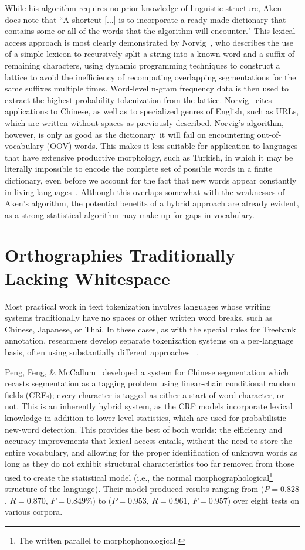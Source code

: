 While his algorithm requires no prior knowledge of linguistic structure, Aken~\cite{aken11} does note that ``A shortcut [...] is to incorporate a ready-made dictionary that contains some or all of the words that the algorithm will encounter." This lexical-access approach is most clearly demonstrated by Norvig~\cite{norvig14}, who describes the use of a simple lexicon to recursively split a string into a known word and a suffix of remaining characters, using dynamic programming techniques to construct a lattice to avoid the inefficiency of recomputing overlapping segmentations for the same suffixes multiple times. Word-level n-gram frequency data is then used to extract the highest probability tokenization from the lattice. Norvig~\cite{norvig14} cites applications to Chinese, as well as to specialized genres of English, such as URLs, which are written without spaces as previously described.
Norvig's algorithm, however, is only as good as the dictionary\textemdash~it will fail on encountering out-of-vocabulary (OOV) words. This makes it less suitable for application to languages that have extensive productive morphology, such as Turkish, in which it may be literally impossible to encode the complete set of possible words in a finite dictionary, even before we account for the fact that new words appear constantly in living languages~\cite{islam07}. Although this overlaps somewhat with the weaknesses of Aken's algorithm, the potential benefits of a hybrid approach are already evident, as a strong statistical algorithm may make up for gaps in vocabulary.

\section{Orthographies Traditionally Lacking Whitespace}
Most practical work in text tokenization involves languages whose writing systems traditionally have no spaces or other written word breaks, such as Chinese, Japanese, or Thai. In these cases, as with the special rules for Treebank annotation, researchers develop separate tokenization systems on a per-language basis, often using substantially different approaches ~\cite{peng04}\cite{suzuki00}.

Peng, Feng, \& McCallum~\cite{peng04} developed a system for Chinese segmentation which recasts segmentation as a tagging problem using linear-chain conditional random fields (CRFs); every character is tagged as either a start-of-word character, or not. This is an inherently hybrid system, as the CRF models incorporate lexical knowledge in addition to lower-level statistics, which are used for probabilistic new-word detection. This provides the best of both worlds: the efficiency and accuracy improvements that lexical access entails, without the need to store the entire vocabulary, and allowing for the proper identification of unknown words as long as they do not exhibit structural characteristics too far removed from those used to create the statistical model (i.e., the normal morphographological\footnote{The written parallel to morphophonological.} structure of the language). Their model produced results ranging from ($P = 0.828$, $R = 0.870$, $F = 0.849\%$) to ($P = 0.953$, $R = 0.961$, $F = 0.957$) over eight tests on various corpora.

